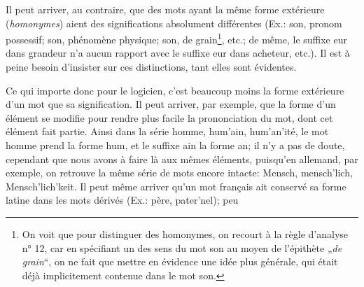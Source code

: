 {{    Il peut arriver, au contraire, que des mots ayant la même forme
    extérieure (\emph{homonymes}) aient des significations absolument
    différentes (Ex.: \textup{son}, pronom possessif; \textup{son},
    phénomène physique; \textup{son}, de grain\footnote{On voit que
      pour distinguer des homonymes, on recourt à la règle d’analyse
      n° 12, car en spécifiant un des sens du mot son au moyen de
      l’épithète „\emph{de grain}“, on ne fait que mettre en évidence une
      idée plus générale, qui était déjà implicitement contenue dans
      le mot son.}, etc.; de même, le suffixe \textup{eur} dans
    \textup{grandeur} n’a aucun rapport avec le suffixe \textup{eur}
    dans \textup{acheteur}, etc.). Il est à peine besoin d’insister
    sur ces distinctions, tant elles sont évidentes.

    Ce qui importe donc pour le logicien, c’est beaucoup moins la
    forme extérieure d’un mot que sa signification. Il peut arriver,
    par exemple, que la forme d’un élément se modifie pour rendre plus
    facile la prononciation du mot, dont cet élément fait
    partie. Ainsi dans la série \textup{homme}, \textup{hum'ain},
    \textup{hum'an'ité}, le mot \textup{homme} prend la forme
    \textup{hum}, et le suffixe \textup{ain} la forme \textup{an}; il
    n’y a pas de doute, cependant que nous avons à faire là aux mêmes
    éléments, puisqu’en allemand, par exemple, on retrouve la même
    série de mots encore intacte: \textup{Mensch},
    \textup{mensch'lich}, \textup{Mensch'lich'keit}. Il peut même
    arriver qu’un mot français ait conservé sa forme latine dans les
    mots dérivés (Ex.: \textup{père}, \textup{pater'nel}); peu}

}

